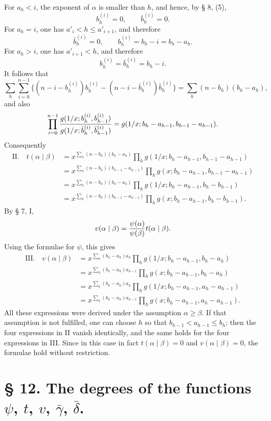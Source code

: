 For $a_h<i$, the exponent of $\alpha$ is smaller than $h$, and hence, by § 8, (5),
\[
 b_h^{(i)}=0,
 \qquad \bar b_h^{(i)}=0.
\]
For $a_h=i$, one has $a'_i<h\le a'_{i+1}$, and therefore
\[
 \bar b_h^{(i)}=0,
 \qquad b_h^{(i)}=b_h-i=b_h-a_h.
\]
For $a_h>i$, one has $a'_{i+1}<h$, and therefore
\[
 b_h^{(i)}=\bar b_h^{(i)}=b_h-i.
\]
It follows that
\begin{equation}
 \sum_h\sum_{i=0}^{n-1}\{(n-i-b_h^{(i)})b_h^{(i)}-(n-i-\bar b_h^{(i)})\bar b_h^{(i)}\}
 =\sum_h(n-b_h)(b_h-a_h),
\tag{4}
\end{equation}
and also
\[
\prod_{i=0}^{n-1}
 {g(1/x;b_h^{(i)},b_{h-1}^{(i)})\over
 g(1/x;\bar b_h^{(i)},\bar b_{h-1}^{(i)})}
 =g(1/x;b_h-a_{h-1},b_{h-1}-a_{h-1}).
\]
Consequently
\begin{align*}
\text{II.}\quad
 t(\alpha\mid\beta)
 &=x^{\sum_h(n-b_h)(b_h-a_h)}
 \prod_h g(1/x;b_h-a_{h-1},b_{h-1}-a_{h-1})\\
 &=x^{\sum_h(n-b_h)(b_{h-1}-a_{h-1})}
 \prod_h g(x;b_h-a_{h-1},b_{h-1}-a_{h-1})\\
 &=x^{\sum_h(n-b_h)(b_h-a_h)}
 \prod_h g(1/x;b_h-a_{h-1},b_h-b_{h-1})\\
 &=x^{\sum_h(n-b_h)(b_{h-1}-a_{h-1})}
 \prod_h g(x;b_h-a_{h-1},b_h-b_{h-1}).
\end{align*}
By § 7, I,
\[
 v(\alpha\mid\beta)={\psi(\alpha)\over\psi(\beta)}t(\alpha\mid\beta).
\]
Using the formulae for $\psi$, this gives
\begin{align*}
\text{III.}\quad
 v(\alpha\mid\beta)&=x^{\sum_h(b_h-a_h)a_h}
 \prod_h g(1/x;b_h-a_{h-1},b_h-a_h)\\
 &=x^{\sum_h(b_h-a_h)a_{h-1}}
 \prod_h g(x;b_h-a_{h-1},b_h-a_h)\\
 &=x^{\sum_h(b_h-a_h)a_h}
 \prod_h g(1/x;b_h-a_{h-1},a_h-a_{h-1})\\
 &=x^{\sum_h(b_h-a_h)a_{h-1}}
 \prod_h g(x;b_h-a_{h-1},a_h-a_{h-1}).
\end{align*}
All these expressions were derived under the assumption $\alpha\ge\beta$. If that assumption is not fulfilled, one can choose $h$ so that $b_{h-1}<a_{h-1}\le b_h$; then the four expressions in II vanish identically, and the same holds for the four expressions in III. Since in this case in fact $t(\alpha\mid\beta)=0$ and $v(\alpha\mid\beta)=0$, the formulae hold without restriction.

\section*{§ 12. The degrees of the functions $\psi$, $t$, $v$, $\bar\gamma$, $\bar\delta$.}

